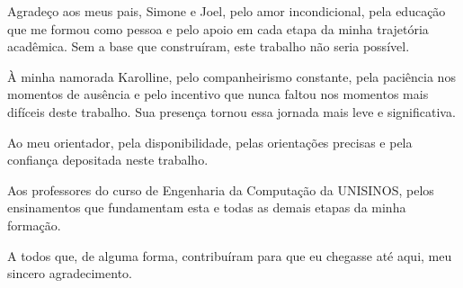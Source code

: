 
\imprimircapa

\imprimirfolhaderosto



\begin{agradecimentos}
Agradeço aos meus pais, Simone e Joel, pelo amor incondicional, pela educação que me
formou como pessoa e pelo apoio em cada etapa da minha trajetória acadêmica. Sem a base
que construíram, este trabalho não seria possível.

À minha namorada Karolline, pelo companheirismo constante, pela paciência nos momentos
de ausência e pelo incentivo que nunca faltou nos momentos mais difíceis deste trabalho.
Sua presença tornou essa jornada mais leve e significativa.

Ao meu orientador, pela disponibilidade, pelas orientações precisas e pela confiança
depositada neste trabalho.

Aos professores do curso de Engenharia da Computação da UNISINOS, pelos ensinamentos que
fundamentam esta e todas as demais etapas da minha formação.

A todos que, de alguma forma, contribuíram para que eu chegasse até aqui, meu sincero
agradecimento.
\end{agradecimentos}



